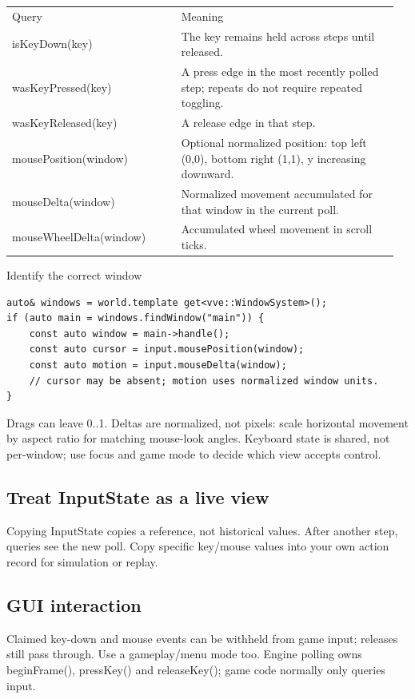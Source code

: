\documentclass[11pt,a4paper]{article}
\begin{document}
{\small
\begin{longtable}{@{}p{0.42\linewidth}p{0.54\linewidth}@{}}
Query & Meaning \\
isKeyDown(key) & The key remains held across steps until released. \\
wasKeyPressed(key) & A press edge in the most recently polled step; repeats do not require repeated toggling. \\
wasKeyReleased(key) & A release edge in that step. \\
mousePosition(window) & Optional normalized position: top left (0,0), bottom right (1,1), y increasing downward. \\
mouseDelta(window) & Normalized movement accumulated for that window in the current poll. \\
mouseWheelDelta(window) & Accumulated wheel movement in scroll ticks. \\
\end{longtable}
}

Identify the correct window

\begin{lstlisting}[language={}]
auto& windows = world.template get<vve::WindowSystem>();
if (auto main = windows.findWindow("main")) {
    const auto window = main->handle();
    const auto cursor = input.mousePosition(window);
    const auto motion = input.mouseDelta(window);
    // cursor may be absent; motion uses normalized window units.
}
\end{lstlisting}

Drags can leave 0..1. Deltas are normalized, not pixels: scale horizontal movement by aspect ratio for matching mouse-look angles. Keyboard state is shared, not per-window; use focus and game mode to decide which view accepts control.

\subsection*{Treat InputState as a live view}
Copying InputState copies a reference, not historical values. After another step, queries see the new poll. Copy specific key/mouse values into your own action record for simulation or replay.

\subsection*{GUI interaction}
Claimed key-down and mouse events can be withheld from game input; releases still pass through. Use a gameplay/menu mode too. Engine polling owns beginFrame(), pressKey() and releaseKey(); game code normally only queries input.
\end{document}
